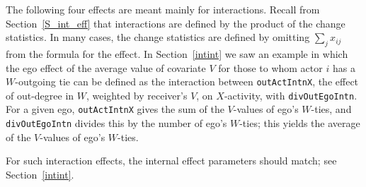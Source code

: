 \documentclass[a4paper,fleqn,11pt]{article}
\newcommand{\+}{\, + \,}
\begin{document}
\smallskip

The following four effects are meant mainly for interactions.
Recall from Section~\ref{S_int_eff} that interactions are defined by
the product of the change statistics.
In many cases, the change statistics are defined by omitting
$ \sum_j x_{ij}$ from the formula for the effect.
In Section~\ref{intint} we saw an example in which the ego effect of the
average value of covariate $V$ for those to whom actor $i$ has a $W$-outgoing tie
can be defined as the interaction between  \texttt{outActIntnX},
the effect of out-degree in $W$, weighted by receiver's $V$, on $X$-activity,
with  \texttt{divOutEgoIntn}. For a given ego, \texttt{outActIntnX} gives the
sum of the $V$-values of ego's $W$-ties, and \texttt{divOutEgoIntn} divides
this by the number of  ego's $W$-ties; this yields the average
of the $V$-values of ego's $W$-ties.

For such interaction effects, the internal effect parameters
should match; see Section~\ref{intint}.
\end{document}
